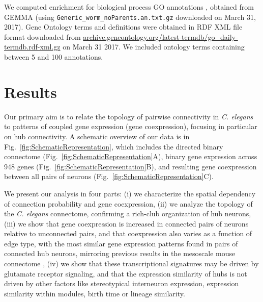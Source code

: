 \documentclass[10pt,letterpaper]{article}
\begin{document}
We computed enrichment for biological process GO annotations \cite{Ashburner2000}, obtained from GEMMA \cite{Zoubarev2012} (using \texttt{Generic\_worm\_noParents.an.txt.gz} downloaded on March 31, 2017).
Gene Ontology terms and definitions were obtained in RDF XML file format downloaded from \url{archive.geneontology.org/latest-termdb/go_daily-termdb.rdf-xml.gz} on March 31 2017.
We included ontology terms containing between 5 and 100 annotations. 


\section*{Results}

Our primary aim is to relate the topology of pairwise connectivity in \emph{C. elegans} to patterns of coupled gene expression (gene coexpression), focusing in particular on hub connectivity.
A schematic overview of our data is in Fig.~\ref{fig:SchematicRepresentation}, which includes the directed binary connectome (Fig.~\ref{fig:SchematicRepresentation}A), binary gene expression across 948 genes (Fig.~\ref{fig:SchematicRepresentation}B), and resulting gene coexpression between all pairs of neurons (Fig.~\ref{fig:SchematicRepresentation}C).

We present our analysis in four parts:
(i) we characterize the spatial dependency of connection probability and gene coexpression,
(ii) we analyze the topology of the \emph{C. elegans} connectome, confirming a rich-club organization of hub neurons,
(iii) we show that gene coexpression is increased in connected pairs of neurons relative to unconnected pairs, and that coexpression also varies as a function of edge type, with the most similar gene expression patterns found in pairs of connected hub neurons, mirroring previous results in the mesoscale mouse connectome \cite{Fulcher:2016ck},
(iv) we show that these transcriptional signatures may be driven by glutamate receptor signaling, and that the expression similarity of hubs is not driven by other factors like stereotypical interneuron expression, expression similarity within modules, birth time or lineage similarity.
\end{document}
